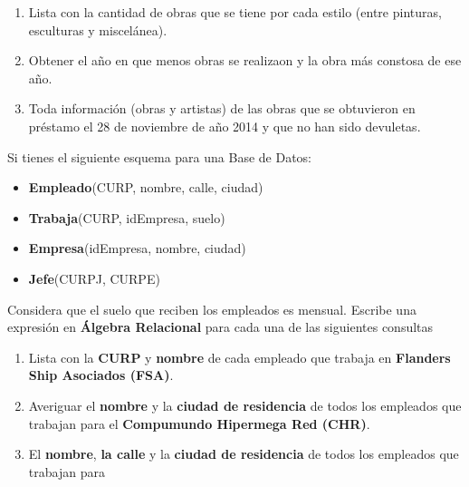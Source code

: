 \documentclass{article}
\begin{document}
\begin{enumerate}
{\begin{enumerate}
{                }
                \item {
                    Lista con la cantidad de obras que se tiene por cada estilo
                    (entre pinturas, esculturas y miscelánea).
                }
                \item {
                    Obtener el año en que menos obras se realizaon y la obra más
                    constosa de ese año.
                }
                \item {
                    Toda información (obras y artistas) de las obras que se
                    obtuvieron en préstamo el 28 de noviembre de año 2014 y que
                    no han sido devuletas.
                }
            \end{enumerate}
            \item {
                Si tienes el siguiente esquema para una Base de Datos:
                \begin{itemize}[label={}]
                    \item \textbf{Empleado}(CURP, nombre, calle, ciudad)
                    \item \textbf{Trabaja}(CURP, idEmpresa, suelo)
                    \item \textbf{Empresa}(idEmpresa, nombre, ciudad)
                    \item \textbf{Jefe}(CURPJ, CURPE)
                \end{itemize}
                Considera que el suelo que reciben los empleados es mensual.
                Escribe una expresión en \textbf{Álgebra Relacional} para cada
                una de las siguientes consultas
                \begin{enumerate}
                    \item {
                        Lista con la \textbf{CURP} y \textbf{nombre} de cada
                        empleado que trabaja en \textbf{Flanders Ship Asociados
                        (FSA)}.
                    }
                    \item {
                        Averiguar el \textbf{nombre} y la \textbf{ciudad de
                        residencia} de todos los empleados que trabajan para el 
                        \textbf{Compumundo Hipermega Red (CHR)}.
                    }
                    \item {
                        El \textbf{nombre}, \textbf{la calle} y la \textbf{ciudad
                        de residencia} de todos los empleados que trabajan para
}
\end{enumerate}}}
\end{enumerate}
\end{document}
